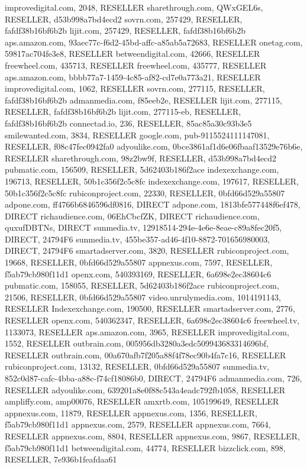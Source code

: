 improvedigital.com, 2048, RESELLER
sharethrough.com, QWxGEL6s, RESELLER, d53b998a7bd4ecd2
sovrn.com, 257429, RESELLER, fafdf38b16bf6b2b
lijit.com, 257429, RESELLER, fafdf38b16bf6b2b
aps.amazon.com, 93aec77c-f6d2-45bd-affc-a85ab5a72683, RESELLER
onetag.com, 59817ac704fe3e8, RESELLER
betweendigital.com, 42666, RESELLER
freewheel.com, 435713, RESELLER
freewheel.com, 435777, RESELLER
aps.amazon.com, bbbb77a7-1459-4c85-af82-cd7e0a773a21, RESELLER
improvedigital.com, 1062, RESELLER
sovrn.com, 277115, RESELLER, fafdf38b16bf6b2b
admanmedia.com, f85eeb2e, RESELLER
lijit.com, 277115, RESELLER, fafdf38b16bf6b2b
lijit.com, 277115-eb, RESELLER, fafdf38b16bf6b2b
connectad.io, 236, RESELLER, 85ac85a30c93b3e5
smilewanted.com, 3834, RESELLER
google.com, pub-9115524111147081, RESELLER, f08c47fec0942fa0
adyoulike.com, 0bce3861af1d6e06fbaaf13529e76b6e, RESELLER
sharethrough.com, 98z2bw9f, RESELLER, d53b998a7bd4ecd2
pubmatic.com, 156509, RESELLER, 5d62403b186f2ace
indexexchange.com, 196713, RESELLER, 50b1c356f2c5c8fc
indexexchange.com, 197617, RESELLER, 50b1c356f2c5c8fc
rubiconproject.com, 22330, RESELLER, 0bfd66d529a55807
adpone.com, ff4766b6846596df0816, DIRECT
adpone.com, 1813bfe577448f6ef478, DIRECT
richaudience.com, 06EhCbcfZK, DIRECT
richaudience.com, quxufDBTNs, DIRECT
sunmedia.tv, 12918514-294e-4e6e-8eae-c89a8fec20f5, DIRECT, 24794F6
sunmedia.tv, 455be357-ad46-4f10-8872-701656980003, DIRECT, 24794F6
smartadserver.com, 3820, RESELLER
rubiconproject.com, 19668, RESELLER, 0bfd66d529a55807
appnexus.com, 7597, RESELLER, f5ab79cb980f11d1
openx.com, 540393169, RESELLER, 6a698e2ec38604c6
pubmatic.com, 158055, RESELLER, 5d62403b186f2ace
rubiconproject.com, 21506, RESELLER, 0bfd66d529a55807
video.unrulymedia.com, 1014191143, RESELLER
Indexexchange.com, 190500, RESELLER
smartadserver.com, 2776, RESELLER
openx.com, 540362347, RESELLER, 6a698e2ec38604c6
freewheel.tv, 1133073, RESELLER
aps.amazon.com, 3965, RESELLER
improvedigital.com, 1552, RESELLER
outbrain.com, 005956db3280a3edc509943683314696bf, RESELLER
outbrain.com, 00a670afb7f205a88f4f78ec90b4fa7c16, RESELLER
rubiconproject.com, 13132, RESELLER, 0bfd66d529a55807
sunmedia.tv, 852c0d87-cafc-4bba-a88c-f74cf18086b0, DIRECT, 24794F6
admanmedia.com, 726, RESELLER
adyoulike.com, 639201a8e0f88c543a4eadc792fb1058, RESELLER
ampliffy.com, amp00076, RESELLER
amxrtb.com, 105199649, RESELLER
appnexus.com, 11879, RESELLER
appnexus.com, 1356, RESELLER, f5ab79cb980f11d1
appnexus.com, 2579, RESELLER
appnexus.com, 7664, RESELLER
appnexus.com, 8804, RESELLER
appnexus.com, 9867, RESELLER, f5ab79cb980f11d1
betweendigital.com, 44774, RESELLER
bizzclick.com, 898, RESELLER, 7e936b1feafdaa61
